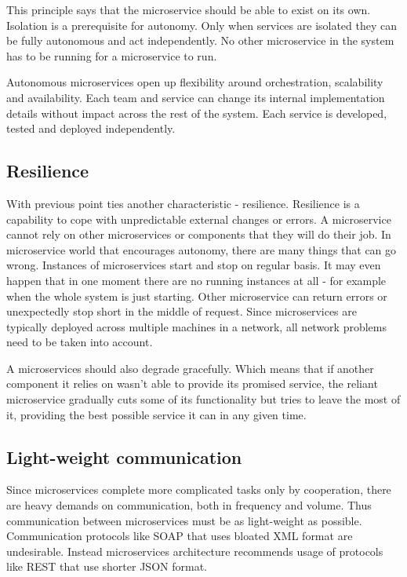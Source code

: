 \documentclass[12pt,oneside]{fithesis2}
\begin{document}
This principle says that the microservice should be able to exist on its own. Isolation is a prerequisite for autonomy. Only when services are isolated they can be fully autonomous and act independently. No other microservice in the system has to be running for a microservice to run.

Autonomous microservices open up flexibility around orchestration, scalability and availability. Each team and service can change its internal implementation details without impact across the rest of the system. Each service is developed, tested and deployed independently.

\subsection{Resilience}

With previous point ties another characteristic - resilience. Resilience is a capability to cope with unpredictable external changes or errors. A microservice cannot rely on other microservices or components that they will do their job.
In microservice world that encourages autonomy, there are many things that can go wrong. Instances of microservices start and stop on regular basis. It may even happen that in one moment there are no running instances at all - for example when the whole system is just starting. Other microservice can return errors or unexpectedly stop short in the middle of request. Since microservices are typically deployed across multiple machines in a network, all network problems need to be taken into account.

A microservices should also degrade gracefully. Which means that if another component it relies on wasn't able to provide its promised service, the reliant microservice gradually cuts some of its functionality but tries to leave the most of it, providing the best possible service it can in any given time.

\subsection{Light-weight communication}

Since microservices complete more complicated tasks only by cooperation, there are heavy demands on communication, both in frequency and volume. Thus communication between microservices must be as light-weight as possible. Communication protocols like SOAP that uses bloated XML format are undesirable. Instead microservices architecture recommends usage of protocols like REST that use shorter JSON format.
\end{document}

